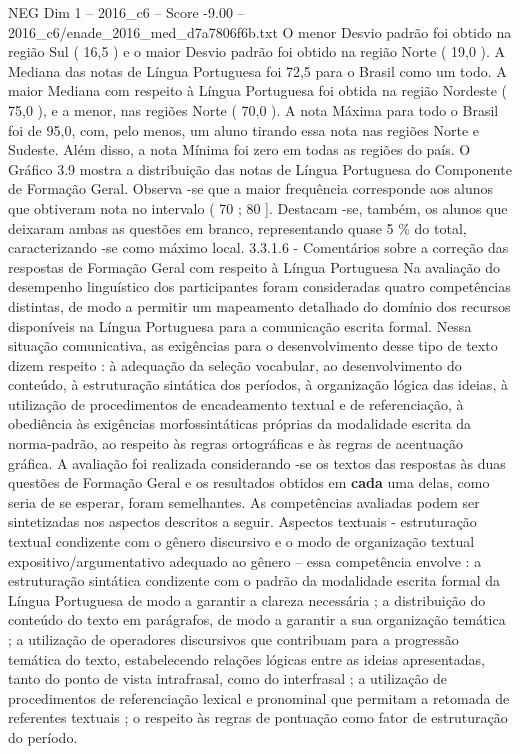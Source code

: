 \begin{textsample}{NEG Dim 1 – 2016\_c6 – Score -9.00 – 2016\_c6/enade\_2016\_med\_d7a7806f6b.txt}
O menor Desvio padrão foi obtido na região Sul ( 16,5 ) e o maior Desvio padrão foi obtido na região Norte ( 19,0 ).
A Mediana das notas de Língua Portuguesa foi 72,5 para o Brasil como um todo.
A maior Mediana com respeito à Língua Portuguesa foi obtida na região Nordeste ( 75,0 ), e a menor, nas regiões Norte ( 70,0 ).
A nota Máxima para todo o Brasil foi de 95,0, com, pelo menos, um aluno tirando essa nota nas regiões Norte e Sudeste.
Além disso, a nota Mínima foi zero em todas as regiões do país.
O Gráfico 3.9 mostra a distribuição das notas de Língua Portuguesa do Componente de Formação Geral.
Observa -se que a maior frequência corresponde aos alunos que obtiveram nota no intervalo ( 70 ; 80 ].
Destacam -se, também, os alunos que deixaram ambas as questões em branco, representando quase 5 \% do total, caracterizando -se como máximo local. 3.3.1.6 - Comentários sobre a correção das respostas de Formação Geral com respeito à Língua Portuguesa Na avaliação do desempenho linguístico dos participantes foram consideradas quatro competências distintas, de modo a permitir um mapeamento detalhado do domínio dos recursos disponíveis na Língua Portuguesa para a comunicação escrita formal.
Nessa situação comunicativa, as exigências para o desenvolvimento desse tipo de texto dizem respeito : à adequação da seleção vocabular, ao desenvolvimento do conteúdo, à estruturação sintática dos períodos, à organização lógica das ideias, à utilização de procedimentos de encadeamento textual e de referenciação, à obediência às exigências morfossintáticas próprias da modalidade escrita da norma-padrão, ao respeito às regras ortográficas e às regras de acentuação gráfica.
A avaliação foi realizada considerando -se os textos das respostas às duas questões de Formação Geral e os resultados obtidos em \textbf{cada} uma delas, como seria de se esperar, foram semelhantes.
As competências avaliadas podem ser sintetizadas nos aspectos descritos a seguir.
Aspectos textuais - estruturação textual condizente com o gênero discursivo e o modo de organização textual expositivo/argumentativo adequado ao gênero – essa competência envolve : a estruturação sintática condizente com o padrão da modalidade escrita formal da Língua Portuguesa de modo a garantir a clareza necessária ; a distribuição do conteúdo do texto em parágrafos, de modo a garantir a sua organização temática ; a utilização de operadores discursivos que contribuam para a progressão temática do texto, estabelecendo relações lógicas entre as ideias apresentadas, tanto do ponto de vista intrafrasal, como do interfrasal ; a utilização de procedimentos de referenciação lexical e pronominal que permitam a retomada de referentes textuais ; o respeito às regras de pontuação como fator de estruturação do período.

\end{textsample}
